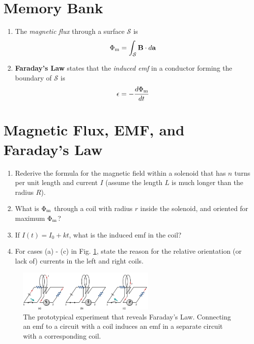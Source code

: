 \documentclass[12pt]{article}
\begin{document}
\maketitle
\small
\section{Memory Bank}
\begin{enumerate}
\item The \textit{magnetic flux} through a surface $\mathcal{S}$ is 
\begin{equation}
\Phi_{\rm m} = \int_{\mathcal{S}} \mathbf{B} \cdot d\mathbf{a}
\end{equation}
\item \textbf{Faraday's Law} states that the \textit{induced emf} in a conductor forming the boundary of $\mathcal{S}$ is 
\begin{equation}
\epsilon = -\frac{d\Phi_{\rm m}}{dt}
\end{equation}
\end{enumerate}

\section{Magnetic Flux, EMF, and Faraday's Law}

\begin{enumerate}
\item Rederive the formula for the magnetic field within a solenoid that has $n$ turns per unit length and current $I$ (assume the length $L$ is much longer than the radius $R$). \\ \vspace{1cm}
\item What is $\Phi_{\rm m}$ through a coil with radius $r$ inside the solenoid, and oriented for maximum $\Phi_{\rm m}$? \\ \vspace{1cm}
\item If $I(t) = I_0 + k t$, what is the induced emf in the coil? \\ \vspace{1cm}
\item For cases (a) - (c) in Fig. \ref{fig:1}, state the reason for the relative orientation (or lack of) currents in the left and right coils.
\end{enumerate}

\begin{figure}
\centering
\includegraphics[width=0.6\textwidth]{figures/farad2.png}
\caption{\label{fig:1} The prototypical experiment that reveals Faraday's Law.  Connecting an emf to a circuit with a coil induces an emf in a separate circuit with a corresponding coil.}
\end{figure}
\end{document}
